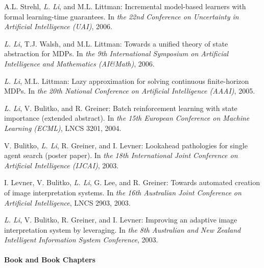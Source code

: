 \documentclass[10pt,twoside,letterpaper]{article}
\newcommand{\selffont}[1]{{\textit{#1}}}
\newcommand{\venuefont}[1]{{\textit{#1}}}
\newcommand{\negitemspace}{\vspace{1mm}}
\newcommand{\myself}{\selffont{L. Li}}
\begin{document}
\begin{compactenum}[(C1)]
\item{A.L. Strehl, \myself, and M.L. Littman: Incremental model-based learners with formal learning-time guarantees.  In \venuefont{the 22nd Conference on Uncertainty in Artificial Intelligence (UAI)}, 2006.}

\item{\myself, T.J. Walsh, and M.L. Littman: Towards a unified theory of state abstraction for MDPs. In \venuefont{the 9th International Symposium on Artificial Intelligence and Mathematics (AI\&Math)}, 2006.}

\item{\myself, M.L. Littman: Lazy approximation for solving continuous finite-horizon MDPs. In \venuefont{the 20th National Conference on Artificial Intelligence (AAAI)}, 2005.}

\item{\myself, V. Bulitko, and R. Greiner: Batch reinforcement learning with state importance (extended abstract).  In \venuefont{the 15th European Conference on Machine Learning (ECML)}, LNCS 3201, 2004.}

\item{V. Bulitko, \myself, R. Greiner, and I. Levner: Lookahead pathologies for single agent search (poster paper). In \venuefont{the 18th International Joint Conference on Artificial Intelligence (IJCAI)}, 2003.}

\item{I. Levner, V. Bulitko, \myself, G. Lee, and R. Greiner: Towards automated creation of image interpretation systems. In \venuefont{the 16th Australian Joint Conference on Artificial
Intelligence}, LNCS 2903, 2003.}

\item{\myself, V. Bulitko, R. Greiner, and I. Levner: Improving an adaptive image interpretation system by leveraging. In \venuefont{the 8th Australian and New Zealand Intelligent Information System Conference}, 2003.}

\end{compactenum} \negitemspace

\paragraph{Book and Book Chapters} \negitemspace
\end{document}
